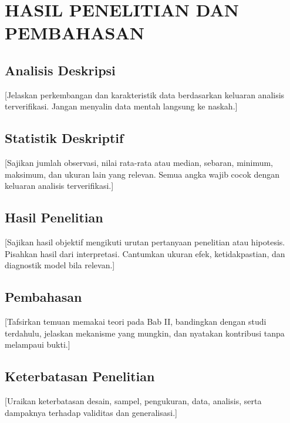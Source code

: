 \chapter{HASIL PENELITIAN DAN PEMBAHASAN}

\section{Analisis Deskripsi}

[Jelaskan perkembangan dan karakteristik data berdasarkan keluaran analisis
terverifikasi. Jangan menyalin data mentah langsung ke naskah.]

\section{Statistik Deskriptif}

[Sajikan jumlah observasi, nilai rata-rata atau median, sebaran, minimum,
maksimum, dan ukuran lain yang relevan. Semua angka wajib cocok dengan keluaran
analisis terverifikasi.]

\section{Hasil Penelitian}

[Sajikan hasil objektif mengikuti urutan pertanyaan penelitian atau hipotesis.
Pisahkan hasil dari interpretasi. Cantumkan ukuran efek, ketidakpastian, dan
diagnostik model bila relevan.]

\section{Pembahasan}

[Tafsirkan temuan memakai teori pada Bab II, bandingkan dengan studi terdahulu,
jelaskan mekanisme yang mungkin, dan nyatakan kontribusi tanpa melampaui bukti.]

\section{Keterbatasan Penelitian}

[Uraikan keterbatasan desain, sampel, pengukuran, data, analisis, serta dampaknya
terhadap validitas dan generalisasi.]
